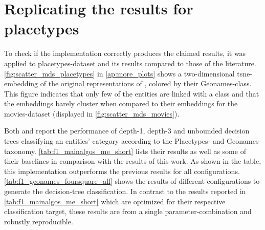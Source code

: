 
\section{Replicating the results for placetypes}
\label{sec:results_placetypes}

To check if the implementation correctly produces the claimed results, it was applied to  placetypes-dataset and its results compared to those of the literature. \autoref{fig:scatter_mds_placetypes} in \autoref{ap:more_plots} shows a two-dimensional \gls{tsne}-embedding of the original representations of \cite{Derrac2015}, colored by their Geonames-class. This figure indicates that only few of the entities are linked with a class and that the embeddings barely cluster when compared to their embeddings for the movies-dataset (displayed in \autoref{fig:scatter_mds_movies}). 

Both \cite{Ager2018} and \cite{Alshaikh2020} report the performance of depth-1, depth-3 and unbounded decision trees classifying an entities' category according to the Placetypes- and Geonames-taxonomy. \autoref{tab:f1_mainalgos_me_short} lists their results as well as some of their baselines in comparison with the results of this work. As shown in the table, this implementation outperforms the previous results for all configurations. \autoref{tab:f1_geonames_foursquare_all} shows the results of different configurations to generate the decision-tree classification. In contrast to the results reported in \ref{tab:f1_mainalgos_me_short} which are optimized for their respective classification target, these results are from a single parameter-combination and robustly reproducible. 


